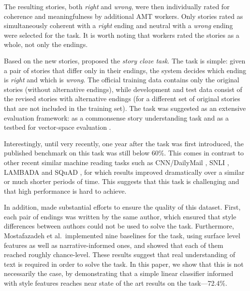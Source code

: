 \documentclass[11pt,a4paper]{article}
\newcommand{\com}[1]{}
\newcommand{\resolved}[1]{}
\newcommand{\roy}[1]{{\color{orange}\textsc{[#1 --rs]}}}
\renewcommand{\roy}[1]{{\color{orange}[#1 --rs]}}
\renewcommand{\roy}[1]{#1}
\begin{document}
The resulting stories, both {\it right} and {\it wrong}, were then individually rated for coherence and meaningfulness by additional AMT workers.
Only stories rated as simultaneously coherent with a {\it right} ending and neutral with a {\it wrong} ending were selected for the task. 
It is worth noting that workers rated the stories as a whole, not only the endings.

Based on the new stories, \citet{Mostafazadeh:2016} proposed the {\it story cloze task}. 
The task is simple:  given a pair of stories that differ only in their endings, the system decides which ending is {\it right} and which is {\it wrong}. 
The official training data contains only the original stories (without alternative endings), while development and test data consist of the revised stories with alternative endings (for a different set of original stories that are not included in the training set).\resolved{\roy{added {\it not} here}}
The task was suggested as an extensive evaluation framework:
as a commonsense story understanding task\com{, 
as the shared task for the  Linking Models of Lexical, Sentential and Discourse-level Semantics workshop (LSDSem 2017),} and as a testbed for vector-space evaluation \cite{mostafazadeh2016story}.

Interestingly, \roy{until very recently, one year after the task was first introduced, the published benchmark on this task was still below 60\%}.
This comes in contrast to other recent similar machine reading tasks such as CNN/DailyMail \cite{hermann2015teaching}, SNLI \cite{bowman2015large}, LAMBADA \cite{Paperno:2016} and SQuAD \cite{rajpurkar2016squad}, for which results improved dramatically over a similar or much shorter periods of time. This suggests that this task is challenging and that high performance is hard to achieve.

In addition, \citet{Mostafazadeh:2016} made substantial efforts to ensure the quality of this dataset. 
First, each pair of endings was written by the same author, which
ensured that style differences between authors could not be used to solve the task. 
Furthermore, Mostafazadeh et al.~implemented nine baselines for the task, using surface level features as well as narrative-informed ones, and showed that each of them reached roughly chance-level.
These results suggest that real understanding of text is required in order to solve the task.
\roy{In this paper, we show that this is not necessarily the case, by demonstrating that a simple linear classifier informed with style features reaches near state of the art results on the task---72.4\%.}
\end{document}
